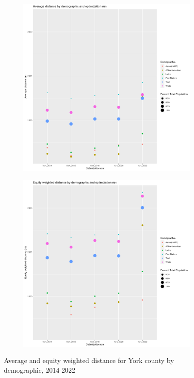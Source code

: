\documentclass[11pt]{article}
\theoremstyle{remark}
\theoremstyle{definition}
\begin{document}
\begin{figure}
	\begin{subfigure}{.8\textwidth}
		\centering
		\includegraphics[width=.8\linewidth]{result analysis/York_SC_original_configs/orig_pop_scaled_avg}
		\label{sfig:York avg dist}
	\end{subfigure} \newline
	\begin{subfigure}{.8\textwidth}
		\centering
		\includegraphics[width=.8\linewidth]{result analysis/York_SC_original_configs/orig_pop_scaled_y_EDE}
		\label{sfig:York equity dist}
	\end{subfigure}
	\caption{Average and equity weighted distance for York county by demographic, 2014-2022}
	\label{fig:York distance graphs}
\end{figure}
\end{document}
